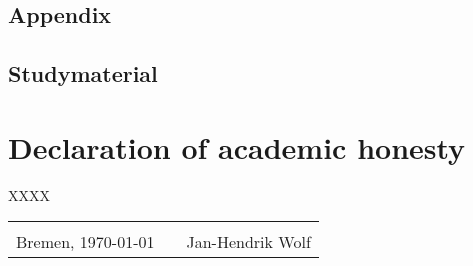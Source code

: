 \documentclass[12pt,numbers=noenddot,parskip,bibliography=totocnumbered,listof=totocnumbered]{scrreprt}
\begin{document}
\begin{appendix} 
\chapter{Appendix}
\newpage
\section{Studymaterial}
\vspace*{\fill}
\label{lab:Studymaterial}
\vspace*{\fill}
\end{appendix}

\clearpage
{}



\listoffigures

\chapter*{Declaration of academic honesty}
\thispagestyle{empty}
XXXX
\begin{center}
\begin{tabular}{lp{2em}l} 
 \hspace{5cm}   && \hspace{4cm} \\\cline{1-1}\cline{3-3} 
 Bremen, \today    && Jan-Hendrik Wolf 
\end{tabular} 
\end{center}
\end{document}
